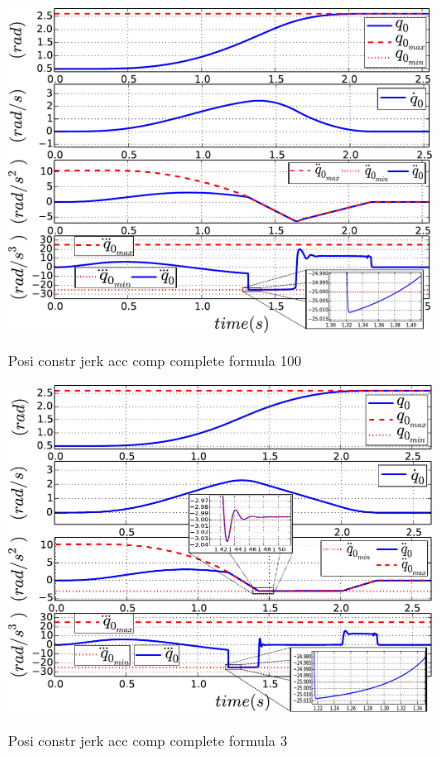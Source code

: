 \documentclass[a4paper, 10pt, conference]{ieeeconf}      %
\begin{document}
{{\begin{figure}[!htbp]
\centering
{\includegraphics[width=1.0\columnwidth]{figures/10_Posi_constr_jerk_acc_comp_complete_formula_100}}
\caption{Posi constr jerk acc comp complete formula 100} 
\label{fig:10_Posi_constr_jerk_acc_comp_complete_formula_100}
\end{figure}
\begin{figure}[!htbp]
\centering
{\includegraphics[width=1.0\columnwidth]{figures/11_Posi_constr_jerk_acc_comp_complete_formula_3}}
\caption{Posi constr jerk acc comp complete formula 3} 
\label{fig:11_Posi_constr_jerk_acc_comp_complete_formula_3}
\end{figure}

\newpage

}}
\end{document}
